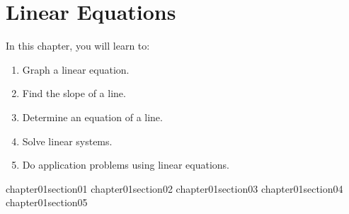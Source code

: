\chapter{Linear Equations}

In this chapter, you will learn to:

\begin{enumerate}
    \item Graph a linear equation.
    \item Find the slope of a line.
    \item Determine an equation of a line.
    \item Solve linear systems.
    \item Do application problems using linear equations.
\end{enumerate}


{chapter01section01}
{chapter01section02}
{chapter01section03}
{chapter01section04}
{chapter01section05}